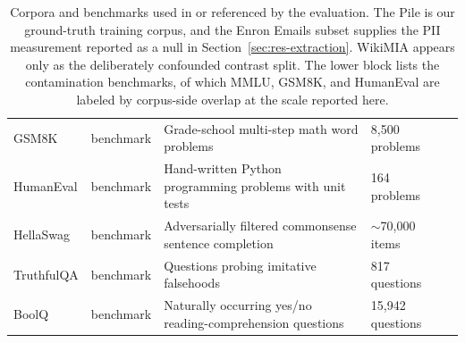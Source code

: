 \begin{table}[t]
\begin{tabular}{@{}llp{7cm}ll@{}}
 GSM8K & benchmark & Grade-school multi-step math word problems & 8{,}500 problems & \citep{cobbe2021gsm8k} \\
 HumanEval & benchmark & Hand-written Python programming problems with unit tests & 164 problems & \citep{chen2021humaneval} \\
 HellaSwag & benchmark & Adversarially filtered commonsense sentence completion & $\sim$70{,}000 items & \citep{zellers2019hellaswag} \\
 TruthfulQA & benchmark & Questions probing imitative falsehoods & 817 questions & \citep{lin2022truthfulqa} \\
 BoolQ & benchmark & Naturally occurring yes/no reading-comprehension questions & 15{,}942 questions & \citep{clark2019boolq} \\
 \bottomrule
 \end{tabular}
 \caption{Corpora and benchmarks used in or referenced by the evaluation. The Pile is
 our ground-truth training corpus, and the Enron Emails subset supplies the PII
 measurement reported as a null in Section~\ref{sec:res-extraction}. WikiMIA appears
 only as the deliberately confounded contrast split. The lower block lists the
 contamination benchmarks, of which MMLU, GSM8K, and HumanEval are labeled by
 corpus-side overlap at the scale reported here.}
 \label{tab:datasets}
\end{table}
